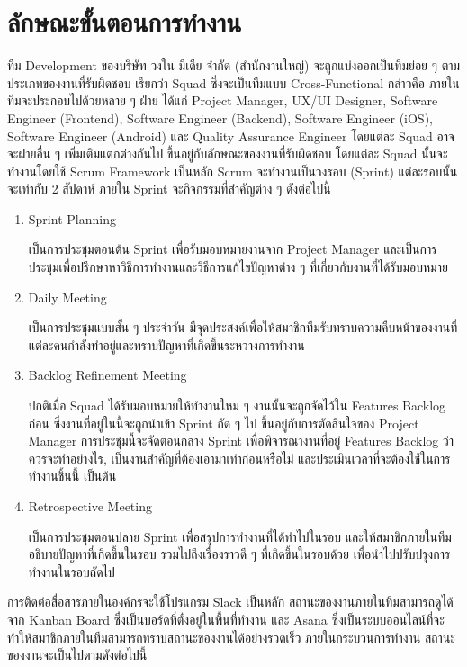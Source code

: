 \section{ลักษณะขั้นตอนการทำงาน}
ทีม Development ของบริษัท วงใน มีเดีย จำกัด (สำนักงานใหญ่) จะถูกแบ่งออกเป็นทีมย่อย ๆ ตามประเภทของงานที่รับผิดชอบ เรียกว่า Squad ซึ่งจะเป็นทีมแบบ Cross-Functional กล่าวคือ ภายในทีมจะประกอบไปด้วยหลาย ๆ ฝ่าย ได้แก่ Project Manager, UX/UI Designer, Software Engineer (Frontend), Software Engineer (Backend), Software Engineer (iOS), Software Engineer (Android) และ Quality Assurance Engineer โดยแต่ละ Squad อาจจะฝ่ายอื่น ๆ เพิ่มเติมแตกต่างกันไป ขึ้นอยู่กับลักษณะของงานที่รับผิดชอบ โดยแต่ละ Squad นั้นจะทำงานโดยใช้ Scrum Framework เป็นหลัก Scrum จะทำงานเป็นวงรอบ (Sprint) แต่ละรอบนั้นจะเท่ากับ 2 สัปดาห์ ภายใน Sprint จะกิจกรรมที่สำคัญต่าง ๆ ดังต่อไปนี้
\begin{enumerate}
	\item Sprint Planning
	
	เป็นการประชุมตอนต้น Sprint เพื่อรับมอบหมายงานจาก Project Manager และเป็นการประชุมเพื่อปรึกษาหาวิธีการทำงานและวิธีการแก้ไขปัญหาต่าง ๆ ที่เกี่ยวกับงานที่ได้รับมอบหมาย
	
	\item Daily Meeting
	
	เป็นการประชุมแบบสั้น ๆ ประจำวัน มีจุดประสงค์เพื่อให้สมาชิกทีมรับทราบความคืบหน้าของงานที่แต่ละคนกำลังทำอยู่และทราบปัญหาที่เกิดขึ้นระหว่างการทำงาน
	
	\item Backlog Refinement Meeting
	
	ปกติเมื่อ Squad ได้รับมอบหมายให้ทำงานใหม่ ๆ งานนั้นจะถูกจัดไว้ใน Features Backlog ก่อน ซึ่งงานที่อยู่ในนี้จะถูกนำเข้า Sprint ถัด ๆ ไป ขึ้นอยู่กับการตัดสินใจของ Project Manager การประชุมนี้จะจัดตอนกลาง Sprint เพื่อพิจารณางานที่อยู่ Features Backlog ว่าควรจะทำอย่างไร, เป็นงานสำคัญที่ต้องเอามาเท่าก่อนหรือไม่ และประเมินเวลาที่จะต้องใช้ในการทำงานชิ้นนี้ เป็นต้น
	
	\item Retrospective Meeting
	
	เป็นการประชุมตอนปลาย Sprint เพื่อสรุปการทำงานที่ได้ทำไปในรอบ และให้สมาชิกภายในทีมอธิบายปัญหาที่เกิดขึ้นในรอบ รวมไปถึงเรื่องราวดี ๆ ที่เกิดขึ้นในรอบด้วย เพื่อนำไปปรับปรุงการทำงานในรอบถัดไป
\end{enumerate}

การติดต่อสื่อสารภายในองค์กรจะใช้โปรแกรม Slack เป็นหลัก สถานะของงานภายในทีมสามารถดูได้จาก Kanban Board ซึ่งเป็นบอร์ดที่ตั้งอยู่ในพื้นที่ทำงาน และ Asana ซึ่งเป็นระบบออนไลน์ที่จะทำให้สมาชิกภายในทีมสามารถทราบสถานะของงานได้อย่างรวดเร็ว ภายในกระบวนการทำงาน สถานะของงานจะเป็นไปตามดังต่อไปนี้

